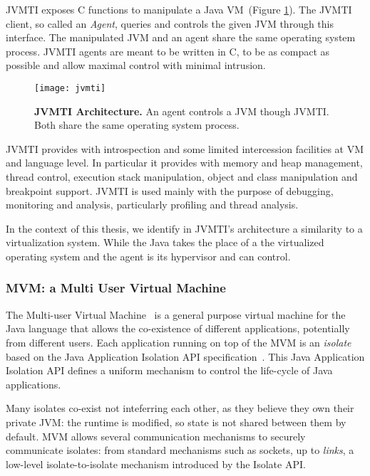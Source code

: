 JVMTI exposes C functions to manipulate a Java VM~(Figure \ref{fig:jvmti}). The JVMTI client, so called an \emph{Agent}, queries and controls the given JVM through this interface. The manipulated JVM and an agent share the same operating system process. JVMTI agents are meant to be written in C, to be as compact as possible and allow maximal control with minimal intrusion.

\begin{figure}[ht]
\begin{center}
\texttt{[image: jvmti]}
\caption{\textbf{JVMTI Architecture.} An agent controls a JVM though JVMTI. Both share the same operating system process.\label{fig:jvmti}}
\end{center}
\end{figure}

JVMTI provides with introspection and some limited intercession facilities at VM and language level. In particular it provides with memory and heap management, thread control, execution stack manipulation, object and class manipulation and breakpoint support. JVMTI is used mainly with the purpose of debugging, monitoring and analysis, particularly profiling and thread analysis.

In the context of this thesis, we identify in JVMTI's architecture a similarity to a virtualization system. While the Java \VM takes the place of a the virtualized operating system and the agent is its hypervisor and can control.

\subsubsection*{MVM: a Multi User Virtual Machine}
The Multi-user Virtual Machine~\cite{Czaj03a,Czaj01a} is a general purpose virtual machine for the Java language that allows the co-existence of different applications, potentially from different users. Each application running on top of the MVM is an \emph{isolate} based on the Java Application Isolation API specification~\cite{JSR121}. This Java Application Isolation API defines a uniform mechanism to control the life-cycle of Java applications.

Many isolates co-exist not inteferring each other, as they believe they own their private JVM: the runtime is modified, so state is not shared between them by default. MVM allows several communication mechanisms to securely communicate isolates: from standard mechanisms such as sockets, up to \emph{links}, a low-level isolate-to-isolate mechanism introduced by the Isolate API.

